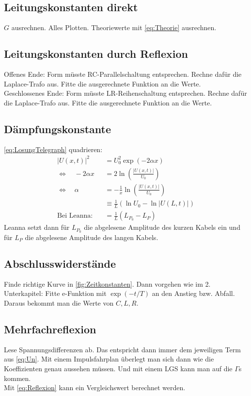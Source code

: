 \subsection{Leitungskonstanten direkt}
$G$ ausrechnen. Alles Plotten. Theoriewerte mit \eqref{eq:Theorie} ausrechnen.
\subsection{Leitungskonstanten durch Reflexion}
Offenes Ende: Form müsste RC-Parallelschaltung entsprechen. Rechne dafür die Laplace-Trafo aus. Fitte die ausgerechnete Funktion an die Werte. \\
Geschlossenes Ende: Form müsste LR-Reihenschaltung entsprechen. Rechne dafür die Laplace-Trafo aus. Fitte die ausgerechnete Funktion an die Werte.
\subsection{Dämpfungskonstante}
\eqref{eq:LosungTelegraph} quadrieren:
\begin{align*}
	\left|U(x,t)\right|^2 &= U_0^2 \exp\left(-2\alpha x\right) \\
	\Leftrightarrow\quad -2\alpha x &= 2\ln\left(\frac{\left|U(x,t)\right|}{U_0}\right) \\
	\Leftrightarrow\quad \alpha &= -\frac{1}{x}\ln\left(\frac{\left|U(x,t)\right|}{U_0}\right) \\
	&\equiv \frac{1}{L}(\ln U_0 - \ln \left|U(L,t)\right|) \\
	\text{Bei Leanna:}\quad &= \frac{1}{L}(L_{P_0} - L_P)
\end{align*}
Leanna setzt dann für $L_{P_0}$ die abgelesene Amplitude des kurzen Kabels ein und für $L_P$ die abgelesene Amplitude des langen Kabels.
\subsection{Abschlusswiderstände}
Finde richtige Kurve in \ref{fig:Zeitkonstanten}. Dann vorgehen wie im 2. Unterkapitel: Fitte e-Funktion mit $\exp(-t/T)$ an den Anstieg bzw. Abfall. Daraus bekommt man die Werte von $C,L,R$.
\subsection{Mehrfachreflexion}
Lese Spannungsdifferenzen ab. Das entspricht dann immer dem jeweiligen Term aus \eqref{eq:Un}. Mit einem Impulsfahrplan überlegt man sich dann wie die Koeffizienten genau aussehen müssen. Und mit einem LGS kann man auf die $\Gamma$s kommen. \\
Mit \eqref{eq:Reflexion} kann ein Vergleichswert berechnet werden.